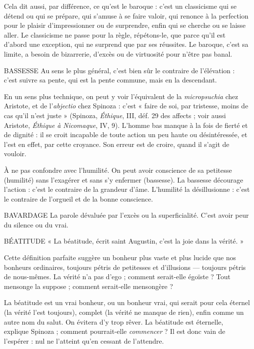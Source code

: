 Cela dit aussi, par différence, ce qu’est le baroque : c’est un classicisme qui
se détend ou qui se prépare, qui s’amuse à se faire valoir, qui renonce à la perfection
pour le plaisir d’impressionner ou de surprendre, enfin qui se cherche
ou se laisse aller. Le classicisme ne passe pour la règle, répétons-le, que parce
qu'il est d’abord une exception, qui ne surprend que par ses réussites. Le
baroque, c’est sa limite, a besoin de bizarrerie, d’excès ou de virtuosité pour
n'être pas banal.

BASSESSE Au sens le plus général, c’est bien sûr le contraire de l'élévation :
c’est suivre sa pente, qui est la pente commune, mais en la descendant.

En un sens plus technique, on peut y voir l’équivalent de la {\it micropsuchia}
chez Aristote, et de l’{\it abjectio} chez Spinoza : c’est « faire de soi, par tristesse,
moins de cas qu’il n’est juste » (Spinoza, {\it Éthique}, III, déf. 29 des affects ; voir
aussi Aristote, {\it Éthique à Nicomaque}, IV, 9). L'homme bas manque à la fois de
fierté et de dignité : il se croit incapable de toute action un peu haute ou désintéressée,
et l’est en effet, par cette croyance. Son erreur est de croire, quand il
s’agit de vouloir.

À ne pas confondre avec l'humilité. On peut avoir conscience de sa petitesse
(humilité) sans l’exagérer et sans s’y enfermer (bassesse). La bassesse
décourage l’action : c’est le contraire de la grandeur d’âme. L’humilité la
désillusionne : c’est le contraire de l’orgueil et de la bonne conscience.

BAVARDAGE La parole dévaluée par l’excès ou la superficialité. C’est avoir
peur du silence ou du vrai.

BÉATITUDE « La béatitude, écrit saint Augustin, c’est la joie dans la vérité. »

Cette définition parfaite suggère un bonheur plus vaste et
plus lucide que nos bonheurs ordinaires, toujours pétris de petitesses et d’illusions —
toujours pétris de nous-mêmes. La vérité n’a pas d’ego ; comment
serait-elle égoïste ? Tout mensonge la suppose ; comment serait-elle mensongère ?

La béatitude est un vrai bonheur, ou un bonheur vrai, qui serait pour cela
éternel (la vérité l’est toujours), complet (la vérité ne manque de rien), enfin
comme un autre nom du salut. On évitera d’y trop rêver. La béatitude est éternelle,
explique Spinoza ; comment pourrait-elle {\it commencer} ? Il est donc vain de
l’espérer : nul ne l’atteint qu’en cessant de l’attendre.


